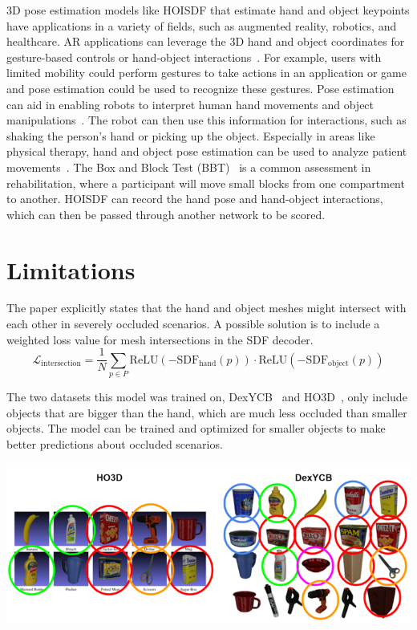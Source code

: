 \documentclass{article}
\begin{document}
3D pose estimation models like HOISDF that estimate hand and object keypoints have applications in a variety of fields, such as augmented reality, robotics, and healthcare. AR applications can leverage the 3D hand and object coordinates for gesture-based controls or hand-object interactions~\cite{chen2019augmentedreality}. For example, users with limited mobility could perform gestures to take actions in an application or game and pose estimation could be used to recognize these gestures. Pose estimation can aid in enabling robots to interpret human hand movements and object manipulations~\cite{billard2019robotics}. The robot can then use this information for interactions, such as shaking the person's hand or picking up the object. Especially in areas like physical therapy, hand and object pose estimation can be used to analyze patient movements~\cite{stenum2021health}. The Box and Block Test (BBT)~\cite{mathiowetz1985boxblock} is a common assessment in rehabilitation, where a participant will move small blocks from one compartment to another. HOISDF can record the hand pose and hand-object interactions, which can then be passed through another network to be scored.

\section*{Limitations}

The paper explicitly states that the hand and object meshes might intersect with each other in severely occluded scenarios. A possible solution is to include a weighted loss value for mesh intersections in the SDF decoder.
\[\mathcal{L}_\text{intersection}=\frac{1}{N}\sum_{p\in P} \text{ReLU}(-\text{SDF}_\text{hand}(p))\cdot \text{ReLU}(-\text{SDF}_\text{object}(p))\]

The two datasets this model was trained on, DexYCB~\cite{chao2021dexycb} and HO3D~\cite{hampali2020honnotate}, only include objects that are bigger than the hand, which are much less occluded than smaller objects. The model can be trained and optimized for smaller objects to make better predictions about occluded scenarios.

\begin{center}
    \includegraphics[scale=1]{hoisdf-5.png}
\end{center}
\end{document}
